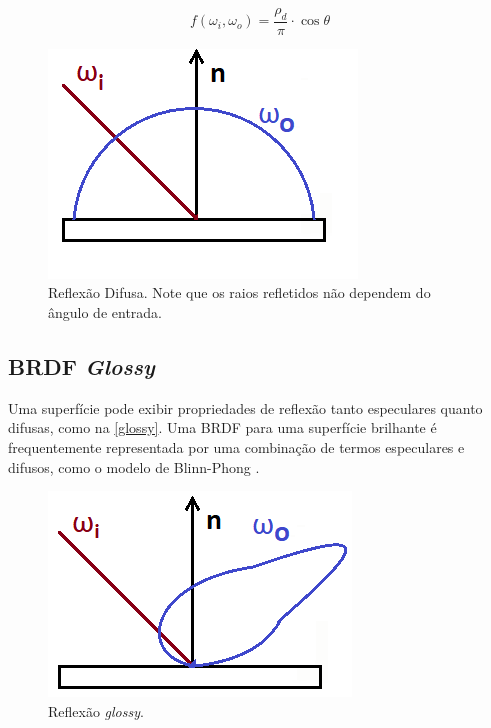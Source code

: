 \documentclass[english, 
               brazil, 
               bsc] %
               {dcomp-abntex2}
\begin{document}
\begin{equation} \label{eq-diffuse}
f(\omega_i, \omega_o) = \frac{\rho_d}{\pi} \cdot \cos \theta
\end{equation}


\begin{figure}[H]
        \caption{\label{diffuse} \small Reflexão Difusa. Note que os raios refletidos não dependem do ângulo de entrada.}
        \begin{center}
            \includegraphics[scale=0.5]{./Imagens/diffuse-2d.png}
        \end{center}
\end{figure}


\subsection{BRDF \textit{Glossy}}
Uma superfície pode exibir propriedades de reflexão tanto especulares quanto difusas, como na \autoref{glossy}. Uma BRDF para uma superfície brilhante é frequentemente representada por uma combinação de termos especulares e difusos, como o modelo de Blinn-Phong \cite{blinn_phong}.


\begin{figure}[H]
  \caption{\label{glossy} \small Reflexão \textit{glossy}. }
        \begin{center}
            \includegraphics[scale=0.5]{./Imagens/glossy-2d.png}
        \end{center}
\end{figure}
\end{document}
